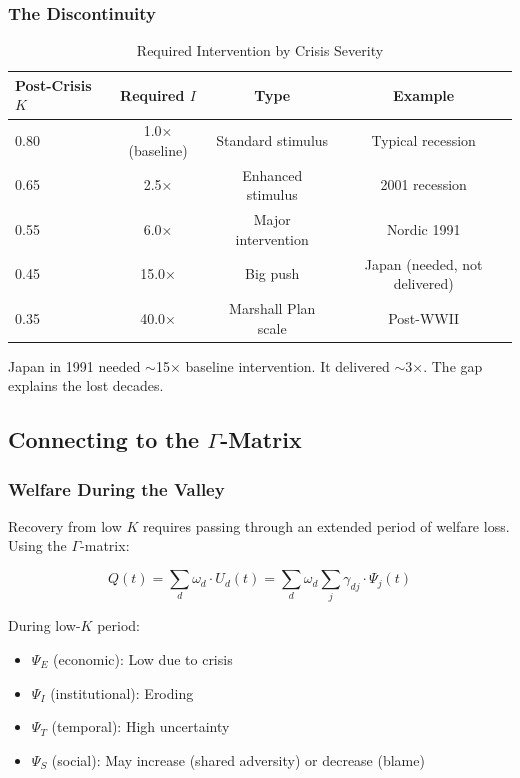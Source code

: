 \subsubsection{The Discontinuity}

\begin{table}[htbp]
\centering
\caption{Required Intervention by Crisis Severity}
\label{tab:intervention-required}
\begin{tabular}{@{}lccc@{}}
\toprule
\textbf{Post-Crisis $K$} & \textbf{Required $I$} & \textbf{Type} & \textbf{Example} \\
\midrule
0.80 & 1.0× (baseline) & Standard stimulus & Typical recession \\
0.65 & 2.5× & Enhanced stimulus & 2001 recession \\
0.55 & 6.0× & Major intervention & Nordic 1991 \\
0.45 & 15.0× & Big push & Japan (needed, not delivered) \\
0.35 & 40.0× & Marshall Plan scale & Post-WWII \\
\bottomrule
\end{tabular}
\end{table}

Japan in 1991 needed $\sim$15× baseline intervention. It delivered $\sim$3×. 
The gap explains the lost decades.

\subsection{Connecting to the $\Gamma$-Matrix}

\subsubsection{Welfare During the Valley}

Recovery from low $K$ requires passing through an extended period of 
welfare loss. Using the $\Gamma$-matrix:

\begin{equation}
Q(t) = \sum_d \omega_d \cdot U_d(t) = \sum_d \omega_d \sum_j \gamma_{dj} \cdot \Psi_j(t)
\end{equation}

During low-$K$ period:
\begin{itemize}
    \item $\Psi_E$ (economic): Low due to crisis
    \item $\Psi_I$ (institutional): Eroding
    \item $\Psi_T$ (temporal): High uncertainty
    \item $\Psi_S$ (social): May increase (shared adversity) or decrease (blame)
\end{itemize}

